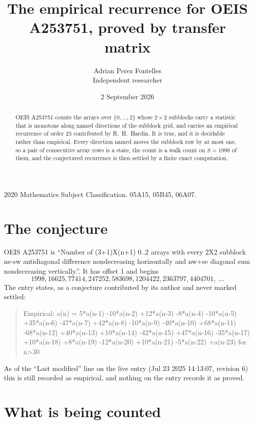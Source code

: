 \documentclass[11pt,a4paper]{article}
\title{The empirical recurrence for OEIS A253751, proved by transfer matrix}
\author{Adrian Perez Fontelles\\ \small Independent researcher}
\date{2 September 2026}
\theoremstyle{plain}
\theoremstyle{definition}
\begin{document}
\maketitle

\begin{abstract}
OEIS A253751 counts the arrays over $\{0,\dots,2\}$ whose $2\times2$ subblocks carry a
statistic that is monotone along named directions of the subblock grid, and carries an
empirical recurrence of order $23$ contributed by R.~H.~Hardin. It is true, and it is
decidable rather than empirical. Every direction named moves the subblock row by at most one,
so a pair of consecutive array rows is a state, the count is a walk count on $S=1998$ of them,
and the conjectured recurrence is then settled by a finite exact computation.
\end{abstract}

\noindent\small 2020 Mathematics Subject Classification. 05A15, 05B45, 06A07.\normalsize

\section{The conjecture}

OEIS A253751 is ``Number of (3+1)X(n+1) 0..2 arrays with every 2X2 subblock ne-sw antidiagonal difference nondecreasing horizontally and nw+se diagonal sum nondecreasing vertically.''. It has offset $1$ and begins
\[
1998, 16625, 77414, 247252, 583698, 1204422, 2363797, 4404701,\ \dots
\]
The entry states, as a conjecture contributed by its author and never marked settled:
\begin{quote}
Empirical: a(n) = 5*a(n-1) -10*a(n-2) +12*a(n-3) -8*a(n-4) -10*a(n-5) +35*a(n-6) -47*a(n-7) +42*a(n-8) -10*a(n-9) -40*a(n-10) +68*a(n-11) -68*a(n-12) +40*a(n-13) +10*a(n-14) -42*a(n-15) +47*a(n-16) -35*a(n-17) +10*a(n-18) +8*a(n-19) -12*a(n-20) +10*a(n-21) -5*a(n-22) +a(n-23) for n>30
\end{quote}
As of the ``Last modified'' line on the live entry (Jul 23 2025 14:13:07, revision 6) this is still
recorded as empirical, and nothing on the entry records it as proved.

\section{What is being counted}
\end{document}
